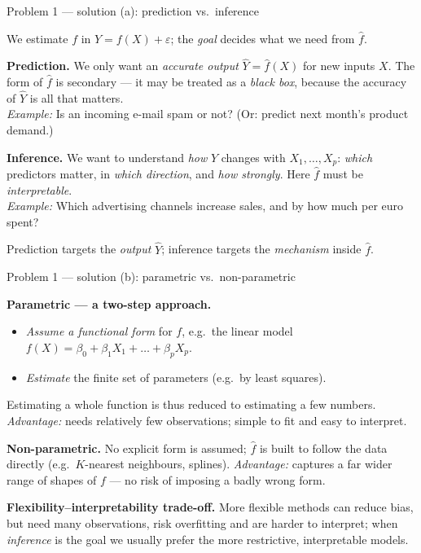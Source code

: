 \documentclass[aspectratio=169,11pt]{beamer}
\begin{document}
\begin{frame}{Problem 1 --- solution (a): prediction vs.\ inference}
  \begin{solutionbox}
    We estimate $f$ in $Y=f(X)+\varepsilon$; the \emph{goal} decides what we need from $\hat f$.
    \medskip

    \textbf{Prediction.} We only want an \emph{accurate output} $\hat Y=\hat f(X)$ for new inputs
    $X$. The form of $\hat f$ is secondary --- it may be treated as a \emph{black box}, because
    the accuracy of $\hat Y$ is all that matters.\\[0.5mm]
    \emph{Example:} Is an incoming e-mail spam or not? (Or: predict next month's product demand.)
    \medskip

    \textbf{Inference.} We want to understand \emph{how} $Y$ changes with $X_1,\dots,X_p$:
    \emph{which} predictors matter, in \emph{which direction}, and \emph{how strongly}. Here
    $\hat f$ must be \emph{interpretable}.\\[0.5mm]
    \emph{Example:} Which advertising channels increase sales, and by how much per euro spent?
  \end{solutionbox}
  \begin{takeaway}
    Prediction targets the \emph{output} $\hat Y$; inference targets the \emph{mechanism} inside $\hat f$.
  \end{takeaway}
\end{frame}

\begin{frame}{Problem 1 --- solution (b): parametric vs.\ non-parametric}
  \begin{solutionbox}
    \textbf{Parametric --- a two-step approach.}
    \begin{itemize}
      \item[(1)] \emph{Assume a functional form} for $f$, e.g.\ the linear model
        $f(X)=\beta_0+\beta_1X_1+\dots+\beta_pX_p$.
      \item[(2)] \emph{Estimate} the finite set of parameters (e.g.\ by least squares).
    \end{itemize}
    Estimating a whole function is thus reduced to estimating a few numbers.
    \emph{Advantage:} needs relatively few observations; simple to fit and easy to interpret.
    \medskip

    \textbf{Non-parametric.} No explicit form is assumed; $\hat f$ is built to follow the data
    directly (e.g.\ $K$-nearest neighbours, splines).
    \emph{Advantage:} captures a far wider range of shapes of $f$ --- no risk of imposing a badly
    wrong form.
    \medskip

    \textbf{Flexibility--interpretability trade-off.} More flexible methods can reduce bias, but
    need many observations, risk overfitting and are harder to interpret; when \emph{inference}
    is the goal we usually prefer the more restrictive, interpretable models.
  \end{solutionbox}
\end{frame}
\end{document}
